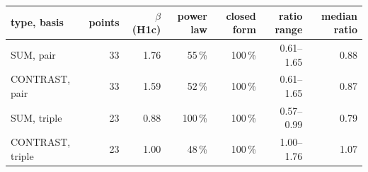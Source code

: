 \footnotesize
\begin{tabular}{lrrrrrr}
\toprule
type, basis & points & $\beta$ (H1c) & power law & closed form & ratio range & median ratio \\
\midrule
SUM, pair & 33 & 1.76 & 55\,\% & 100\,\% & 0.61--1.65 & 0.88 \\
CONTRAST, pair & 33 & 1.59 & 52\,\% & 100\,\% & 0.61--1.65 & 0.87 \\
SUM, triple & 23 & 0.88 & 100\,\% & 100\,\% & 0.57--0.99 & 0.79 \\
CONTRAST, triple & 23 & 1.00 & 48\,\% & 100\,\% & 1.00--1.76 & 1.07 \\
\bottomrule
\end{tabular}
